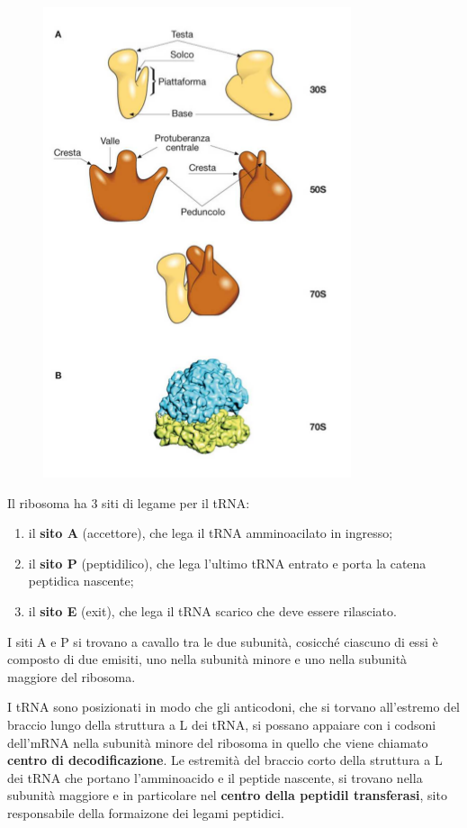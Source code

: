 \documentclass[11pt]{book}
\begin{document}
\begin{figure}[htp]
\centering
\includegraphics[scale=1.00]{img/56_Ribosoma.png}
\caption{}
\label{ribosoma}
\end{figure}

Il ribosoma ha 3 siti di legame per il tRNA:

\begin{enumerate}
\def\labelenumi{\arabic{enumi}.}
\itemsep1pt\parskip0pt
\item
  il \textbf{sito A} (accettore), che lega il tRNA amminoacilato in
  ingresso;
\item
  il \textbf{sito P} (peptidilico), che lega l'ultimo tRNA entrato e
  porta la catena peptidica nascente;
\item
  il \textbf{sito E} (exit), che lega il tRNA scarico che deve essere
  rilasciato.
\end{enumerate}

I siti A e P si trovano a cavallo tra le due subunità, cosicché ciascuno
di essi è composto di due emisiti, uno nella subunità minore e uno nella
subunità maggiore del ribosoma.

I tRNA sono posizionati in modo che gli anticodoni, che si torvano
all'estremo del braccio lungo della struttura a L dei tRNA, si possano
appaiare con i codsoni dell'mRNA nella subunità minore del ribosoma in
quello che viene chiamato \textbf{centro di decodificazione}. Le
estremità del braccio corto della struttura a L dei tRNA che portano
l'amminoacido e il peptide nascente, si trovano nella subunità maggiore
e in particolare nel \textbf{centro della peptidil transferasi}, sito
responsabile della formaizone dei legami peptidici.
\end{document}
